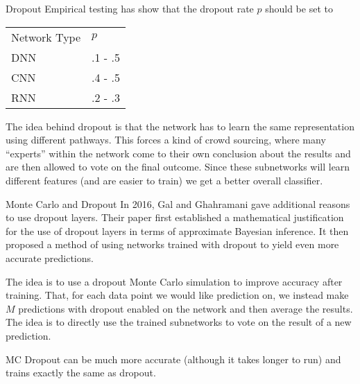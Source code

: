 \documentclass[10pt, table, dvipsnames,xcdraw,handout]{beamer}
\begin{document}
\begin{frame}[fragile]{Dropout}
Empirical testing has show that the dropout rate $p$ should be set to
\begin{center}
\begin{table}[]
\begin{tabular}{ll}
Network Type & $p$     \\
DNN          & .1 - .5 \\
CNN          & .4 - .5   \\
RNN          & .2 - .3  
\end{tabular}
\end{table}
\end{center}
The idea behind dropout is that the network has to learn the same representation using different pathways. This forces a kind of crowd sourcing, where many ``experts'' within the network come to their own conclusion about the results and are then allowed to vote on the final outcome. Since these subnetworks will learn different features (and are easier to train) we get a better overall classifier. 
\end{frame}





\begin{frame}[fragile]{Monte Carlo and Dropout}
In 2016, Gal and Ghahramani gave additional reasons to use dropout layers. Their paper first established a mathematical justification for the use of dropout layers in terms of approximate Bayesian inference. It then proposed a method of using networks trained with dropout to yield even more accurate predictions. 

The idea is to use a dropout Monte Carlo simulation to improve accuracy after training. That, for each data point we would like prediction on, we instead make $M$ predictions with dropout enabled on the network and then average the results. The idea is to directly use the trained subnetworks to vote on the result of a new prediction. 

MC Dropout can be much more accurate (although it takes longer to run) and trains exactly the same as dropout.
\end{frame}
\end{document}
